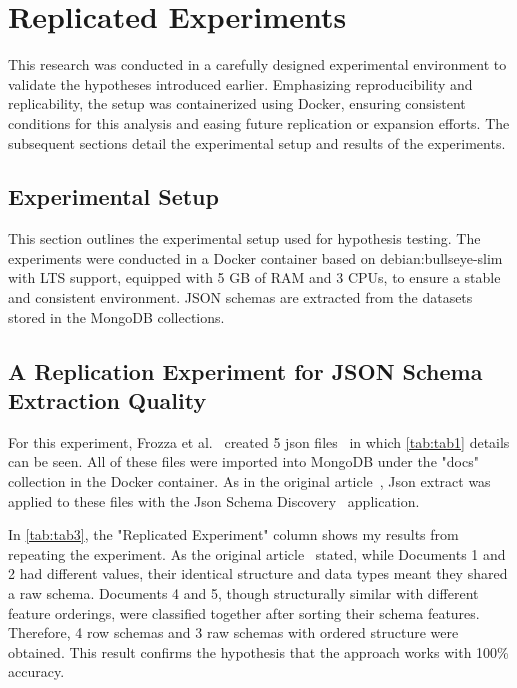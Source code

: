 \documentclass[sigconf, nonacm]{acmart}
\begin{document}
\section{Replicated Experiments}
This research was conducted in a carefully designed experimental environment to validate the hypotheses introduced earlier. Emphasizing reproducibility and replicability, the setup was containerized using Docker, ensuring consistent conditions for this analysis and easing future replication or expansion efforts. The subsequent sections detail the experimental setup and results of the experiments.

\subsection{Experimental Setup}

This section outlines the experimental setup used for hypothesis testing. The experiments were conducted in a Docker container based on debian:bullseye-slim with LTS support, equipped with 5 GB of RAM and 3 CPUs, to ensure a stable and consistent environment. JSON schemas are extracted from the datasets stored in the MongoDB collections.

\subsection{A Replication Experiment for JSON Schema Extraction Quality }
For this experiment, Frozza et al.~\cite{SchemaExtraction} created 5 json files~\cite{JsonDataDocs} in which \autoref{tab:tab1} details can be seen. All of these files were imported into MongoDB under the "docs" collection in the Docker container. As in the original article~\cite{SchemaExtraction}, Json extract was applied to these files with the Json Schema Discovery~\cite{JSONSchemaDiscovery} application. 

In \autoref{tab:tab3}, the "Replicated Experiment" column shows my results from repeating the experiment. As the original article~\cite{SchemaExtraction} stated, while Documents 1 and 2 had different values, their identical structure and data types meant they shared a raw schema. Documents 4 and 5, though structurally similar with different feature orderings, were classified together after sorting their schema features. Therefore, 4 row schemas and 3 raw schemas with ordered structure were obtained. This result confirms the hypothesis that the approach works with 100\% accuracy.
\end{document}
